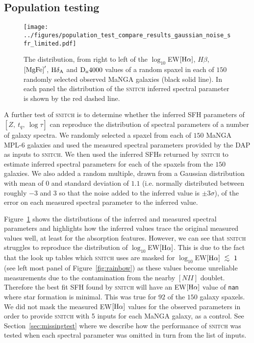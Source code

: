 \documentclass[useAMS,usenatbib]{mn2e}
\def\lesssim{\mathrel{\hbox{\rlap{\hbox{\lower3pt\hbox{$\sim$}}}\hbox{\raise2pt\hbox{$<$}}}}}
\begin{document}
\subsection{Population testing}\label{sec:poptest}

\begin{figure*}
\centering
\texttt{[image: ../figures/population\_test\_compare\_results\_gaussian\_noise\_sfr\_limited.pdf]}
\caption{The distribution, from right to left of the $\log_{10}$EW$[\rm{H}\alpha]$, $H\beta$, $\rm{[MgFe]}^{\prime}$, $\rm{H}\delta_A$ and $\rm{D_n4000}$ values of a random spaxel in each of $150$ randomly selected observed MaNGA galaxies (black solid line). In each panel the distribution of the \textsc{snitch} inferred spectral parameter is shown by the red dashed line.}
\label{fig:mangacompare}
\end{figure*}


A further test of \textsc{snitch} is to determine whether the inferred SFH parameters of $[Z,~t_q,~\log\tau]$ can reproduce the distribution of spectral parameters of a number of galaxy spectra. We randomly selected a spaxel from each of $150$ MaNGA MPL-6 galaxies  and used the measured spectral parameters provided by the DAP as inputs to \textsc{snitch}. We then used the inferred SFHs returned by \textsc{snitch} to estimate inferred spectral parameters for each of the spaxels from the $150$ galaxies. We also added a random multiple, drawn from a Gaussian distribution with mean of $0$ and standard deviation of $1.1$ (i.e. normally distributed between roughly $-3$ and $3$ so that the noise added to the inferred value is $\pm3\sigma$), of the error on each measured spectral parameter to the inferred value.

Figure~\ref{fig:mangacompare} shows the distributions of the inferred and measured spectral parameters and highlights how the inferred values trace the original measured values well, at least for the absorption features. However, we can see that \textsc{snitch} struggles to reproduce the distribution of $\log_{10}$EW$[\rm{H}\alpha]$. This is due to the fact that the look up tables which \textsc{snitch} uses are masked for $\log_{10}$EW$[\rm{H}\alpha]~\lesssim~1$ (see left most panel of Figure~\ref{fig:rainbow}) as these values become unreliable measurements due to the contamination from the nearby $[NII]$ doublet. Therefore the best fit SFH found by \textsc{snitch} will have an EW$[\rm{H}\alpha]$ value of \texttt{nan} where star formation is minimal. This was true for $92$ of the $150$ galaxy spaxels. We did not mask the measured EW$[\rm{H}\alpha]$ values for the observed parameters in order to provide \textsc{snitch} with 5 inputs for each MaNGA galaxy, as a control. See Section~\ref{sec:missingtest} where we describe how the performance of \textsc{snitch} was tested when each spectral parameter was omitted in turn from the list of inputs. 
\end{document}
